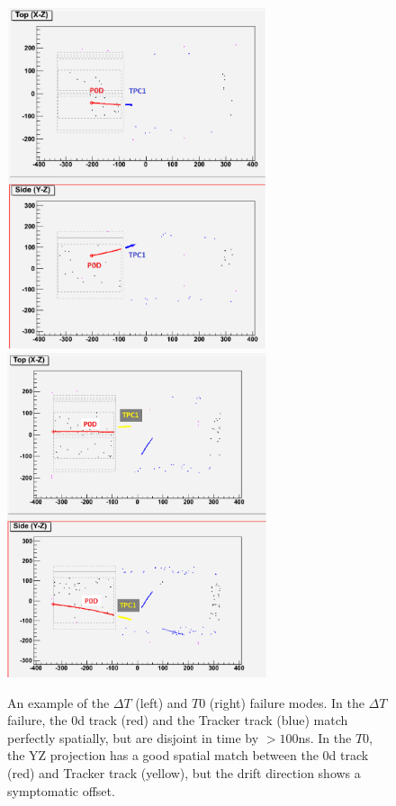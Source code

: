 \begin{figure}[h]
  \centering
  \includegraphics[width=3in]{Figures/delltaTmismatch.eps}
  \includegraphics[width=3in]{Figures/t0mismatch.eps}
  \caption{An example of the $\Delta T$ (left) and $T0$ (right) failure modes. In the  $\Delta T$ failure, the \p0d track (red) and the Tracker track (blue) match perfectly spatially, but are disjoint in time by $>100$ns. In the $T0$, the YZ projection has a good spatial match between the \p0d track (red) and Tracker track (yellow), but the drift direction shows a symptomatic offset.} 
  \label{fig:mismatchexamples}
\end{figure}

